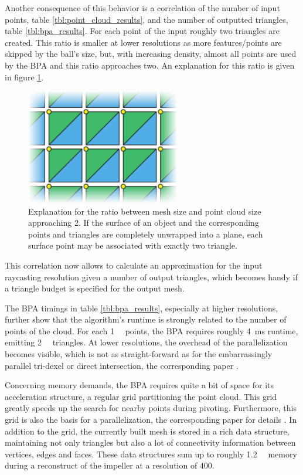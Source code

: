 Another consequence of this behavior is a correlation of the number of input points, \cf table \ref{tbl:point_cloud_results}, and the number of outputted triangles, \cf table \ref{tbl:bpa_results}.
For each point of the input roughly two triangles are created.
This ratio is smaller at lower resolutions as more features/points are skipped by the ball's size, but, with increasing density, almost all points are used by the BPA and this ratio approaches two.
An explanation for this ratio is given in figure \ref{fig:bpa_point_triangle_ratio}.
%
\begin{figure}
	\centering
	\includegraphics[width=0.6\textwidth]{images/bpa_point_triangle_ratio}
	\caption{
		Explanation for the ratio between mesh size and point cloud size approaching 2.
		If the surface of an object and the corresponding points and triangles are completely unwrapped into a plane, each surface point may be associated with exactly two triangle.
	}
	\label{fig:bpa_point_triangle_ratio}
\end{figure}
%
This correlation now allows to calculate an approximation for the input raycasting resolution given a number of output triangles, which becomes handy if a triangle budget is specified for the output mesh.

The BPA timings in table \ref{tbl:bpa_results}, especially at higher resolutions, further show that the algorithm's runtime is strongly related to the number of points of the cloud.
For each \SI{1}{\kilo\nothing} points, the BPA requires roughly \SI{4}{\milli\second} runtime, emitting \SI{2}{\kilo\nothing} triangles.
At lower resolutions, the overhead of the parallelization becomes visible, which is not as straight-forward as for the embarrassingly parallel tri-dexel or direct intersection, \cf the corresponding paper \cite{bpa_vml}.

Concerning memory demands, the BPA requires quite a bit of space for its acceleration structure, a regular grid partitioning the point cloud.
This grid greatly speeds up the search for nearby points during pivoting.
Furthermore, this grid is also the basis for a parallelization, \cf the corresponding paper for details \cite{bpa_vml}.
In addition to the grid, the currently built mesh is stored in a rich data structure, maintaining not only triangles but also a lot of connectivity information between vertices, edges and faces.
These data structures sum up to roughly \SI{1.2}{\gibi\byte} memory during a reconstruct of the impeller at a resolution of 400.


